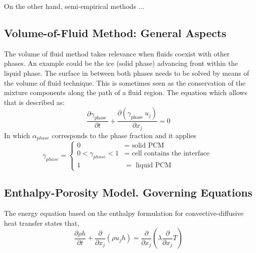 On the other hand, semi-empirical methods ...
\subsection{Volume-of-Fluid Method: General Aspects}
The volume of fluid method takes relevance when fluids coexist with other phases. An example could be the ice (solid phase) advancing front within the liquid phase. The surface in between both phases needs to be solved by means of the volume of fluid technique.
\newline
This is sometimes seen as the conservation of the mixture components along the path of a fluid region. The equation which allows that is described as:
\begin{equation}
	\frac{\partial \gamma_{\text {phase }}}{\partial t}+\frac{\partial\left(\gamma_{\text {phase }} u_{j}\right)}{\partial x_{j}}=0
	\label{2.1}
\end{equation}
In which $\alpha_{phase}$ corresponds to the phase fraction and it applies
\begin{equation}
	\gamma_{phase}= \begin{cases}
		0 & =\text { solid PCM } \\ 0<\gamma_{phase}<1 & =\text { cell contains the interface } \\ 1 & =\text { liquid } \mathrm{PCM}
	\end{cases}
	\label{2.2}
\end{equation}

\subsection{Enthalpy-Porosity Model. Governing Equations}
The energy equation based on the enthalpy formulation for convective-diffusive heat transfer states that,
\begin{equation}
	\frac{\partial \rho h}{\partial t}+\frac{\partial}{\partial x_{j}}\left(\rho u_{j} h\right)=\frac{\partial}{\partial x_{j}}\left(\lambda \frac{\partial}{\partial x_{j}} T\right)
	\label{2.3}
\end{equation}

